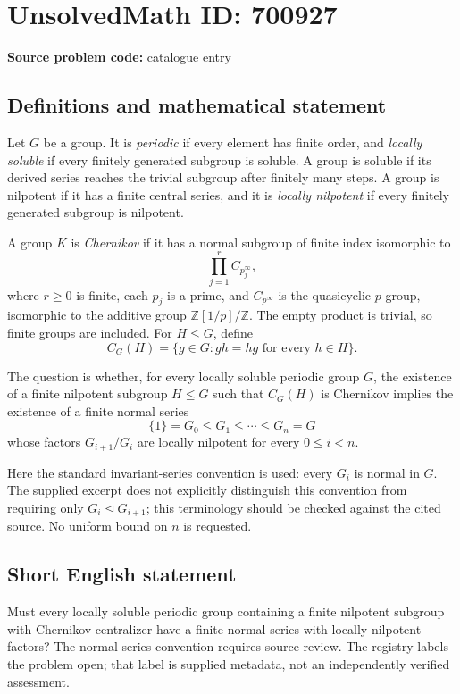 \documentclass[11pt]{article}
\newcommand{\Z}{\mathbb{Z}}
\begin{document}
\section*{UnsolvedMath ID: 700927}
\textbf{Source problem code:} catalogue entry
\subsection{Definitions and mathematical statement}
Let \(G\) be a group. It is \emph{periodic} if every element has finite order, and \emph{locally soluble} if every finitely generated subgroup is soluble. A group is soluble if its derived series reaches the trivial subgroup after finitely many steps. A group is nilpotent if it has a finite central series, and it is \emph{locally nilpotent} if every finitely generated subgroup is nilpotent.

A group \(K\) is \emph{Chernikov} if it has a normal subgroup of finite index isomorphic to
\[
\prod_{j=1}^{r} C_{p_j^\infty},
\]
where \(r\geq 0\) is finite, each \(p_j\) is a prime, and \(C_{p^\infty}\) is the quasicyclic \(p\)-group, isomorphic to the additive group \(\Z[1/p]/\Z\). The empty product is trivial, so finite groups are included. For \(H\leq G\), define
\[
C_G(H)=\{g\in G:gh=hg\text{ for every }h\in H\}.
\]

The question is whether, for every locally soluble periodic group \(G\), the existence of a finite nilpotent subgroup \(H\leq G\) such that \(C_G(H)\) is Chernikov implies the existence of a finite normal series
\[
\{1\}=G_0\leq G_1\leq\cdots\leq G_n=G
\]
whose factors \(G_{i+1}/G_i\) are locally nilpotent for every \(0\leq i<n\).

Here the standard invariant-series convention is used: every \(G_i\) is normal in \(G\). The supplied excerpt does not explicitly distinguish this convention from requiring only \(G_i\trianglelefteq G_{i+1}\); this terminology should be checked against the cited source. No uniform bound on \(n\) is requested.
\subsection{Short English statement}
Must every locally soluble periodic group containing a finite nilpotent subgroup with Chernikov centralizer have a finite normal series with locally nilpotent factors? The normal-series convention requires source review. The registry labels the problem open; that label is supplied metadata, not an independently verified assessment.
\end{document}
